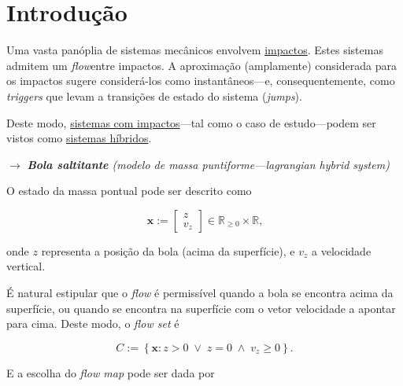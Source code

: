\usetikzlibrary{automata, arrows.meta, positioning}
\section{Introdução}
\label{sec:intro}

Uma vasta panóplia de sistemas mecânicos envolvem \underline{impactos}. Estes sistemas admitem um \textit{flow}\footnotemark[1] entre impactos. A aproximação (amplamente) considerada para os impactos sugere considerá-los como instantâneos---e, consequentemente, como \textit{triggers} que levam a transições de estado do sistema (\textit{jumps}\footnotemark[1]). 

Deste modo, \underline{sistemas com impactos}---tal como o caso de estudo---podem ser vistos como \underline{sistemas híbridos}.

\vspace{1em}
\noindent $\pmb{\rightarrow}$ \textit{\textbf{Bola saltitante} (modelo de massa puntiforme---lagrangian hybrid system)}
\vspace{0.25em}

\noindent O estado da massa pontual pode ser descrito como

\vspace{-0.9em}
$$
    \pmb{x} := 
            \begin{bmatrix}
                z\\
                v_z
            \end{bmatrix}
            \in \mathbb{R}_{\ge 0} \times \mathbb{R}
            \text{,}
$$

\vspace{-0.2em}
\noindent onde $z$ representa a posição da bola (acima da superfície), e $v_z$ a velocidade vertical.

É natural estipular que o \textit{flow} é permissível quando a bola se encontra acima da superfície, ou quando se encontra na superfície com o vetor velocidade a apontar para cima. Deste modo, o \textit{flow set} é

\vspace{-1em}
$$ 
    C := \left\{ \pmb{x}: z > 0\; \lor\; z = 0\; \land\; v_z \ge 0 \right\}.
$$

\vspace{-0.25em}
\noindent E a escolha do \textit{flow map} pode ser dada por

